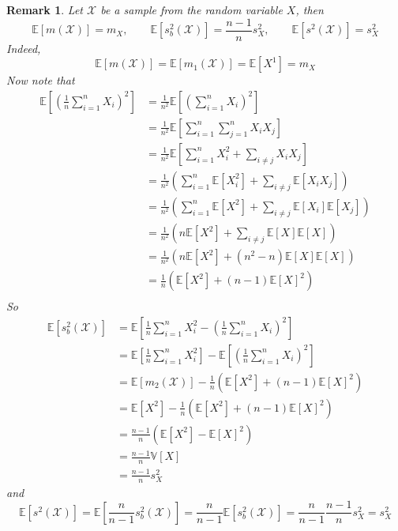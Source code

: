\documentclass[12pt]{article}
\newtheorem{remark}[theorem]{Remark}
\begin{document}
\begin{remark}\label{ExpecStats} Let $\mathscr{X}$ be a sample from the random
    variable $X$, then
    $$
        \mathbb{E}[m(\mathscr{X})]=m_X,
        \quad\quad
        \mathbb{E}[s_b^2(\mathscr{X})]=\frac{n-1}{n}s_X^2,
        \quad\quad
        \mathbb{E}[s^2(\mathscr{X})]=s_X^2
    $$
    Indeed,
    $$
        \mathbb{E}[m(\mathscr{X})]
        =\mathbb{E}[m_{1}(\mathscr{X})]
        =\mathbb{E}[X^1]=m_X
    $$
    Now note that
    \begin{align*}
        \mathbb{E}\left[{\left(\frac{1}{n}\sum_{i=1}^n X_i\right)}^2\right]
         & =\frac{1}{n^2}
        \mathbb{E}\left[{\left(\sum_{i=1}^n X_i\right)}^2\right]        \\
         & =\frac{1}{n^2}
        \mathbb{E}\left[\sum_{i=1}^n\sum_{j=1}^n X_i X_j\right]         \\
         & =\frac{1}{n^2}
        \mathbb{E}\left[\sum_{i=1}^n X_i^2+\sum_{i\neq j}X_i X_j\right] \\
         & =\frac{1}{n^2}
        \left(\sum_{i=1}^n\mathbb{E}[X_i^2]
        +\sum_{i\neq j}\mathbb{E}[X_i X_j]\right)                       \\
         & =\frac{1}{n^2}
        \left(\sum_{i=1}^n\mathbb{E}[X^2]
        +\sum_{i\neq j}\mathbb{E}[X_i]\mathbb{E}[X_j]\right)            \\
         & =\frac{1}{n^2}
        \left(n\mathbb{E}[X^2]
        +\sum_{i\neq j}\mathbb{E}[X]\mathbb{E}[X]\right)                \\
         & =\frac{1}{n^2}
        \left(n\mathbb{E}[X^2]+(n^2-n)\mathbb{E}[X]\mathbb{E}[X]\right) \\
         & =\frac{1}{n}
        \left(\mathbb{E}[X^2]+(n-1){\mathbb{E}[X]}^2\right)             \\
    \end{align*}
    So
    \begin{align*}
        \mathbb{E}[s_b^2(\mathscr{X})]
         & =\mathbb{E}\left[\frac{1}{n}\sum_{i=1}^n X_i^2
        -{\left(\frac{1}{n}\sum_{i=1}^n X_i\right)}^2\right]                 \\
         & =\mathbb{E}\left[\frac{1}{n}\sum_{i=1}^n X_i^2\right]
        -\mathbb{E}\left[{\left(\frac{1}{n}\sum_{i=1}^n X_i\right)}^2\right] \\
         & =\mathbb{E}[m_{2}(\mathscr{X})]
        -\frac{1}{n}\left(\mathbb{E}[X^2]+(n-1){\mathbb{E}[X]}^2\right)      \\
         & =\mathbb{E}[X^2]
        -\frac{1}{n}\left(\mathbb{E}[X^2]+(n-1){\mathbb{E}[X]}^2\right)      \\
         & =\frac{n-1}{n}(\mathbb{E}[X^2]
        -{\mathbb{E}[X]}^2)                                                  \\
         & =\frac{n-1}{n}\mathbb{V}[X]                                       \\
         & =\frac{n-1}{n}s_X^2
    \end{align*}
    and
    $$
        \mathbb{E}[s^2(\mathscr{X})]
        =\mathbb{E}[\frac{n}{n-1}s_b^2(\mathscr{X})]
        =\frac{n}{n-1}\mathbb{E}[s_b^2(\mathscr{X})]
        =\frac{n}{n-1}\frac{n-1}{n}s_X^2
        =s_X^2
    $$
\end{remark}
\end{document}
